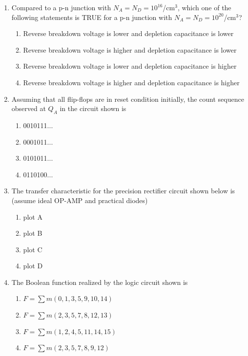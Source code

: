 \documentclass[journal,12pt,onecolumn]{IEEEtran}
\begin{document}
\begin{enumerate}
\item Compared to a p-n junction with $N_A=N_D=10^{16}$/cm$^3$, which one of the following statements is TRUE for a p-n junction with $N_A=N_D=10^{20}$/cm$^3$?
\begin{multicols}{2}
\begin{enumerate}
\item Reverse breakdown voltage is lower and depletion capacitance is lower
\item Reverse breakdown voltage is higher and depletion capacitance is lower
\item Reverse breakdown voltage is lower and depletion capacitance is higher
\item Reverse breakdown voltage is higher and depletion capacitance is higher
\end{enumerate}
\end{multicols}

\item Assuming that all flip-flops are in reset condition initially, the count sequence observed at $Q_A$ in the circuit shown is
\begin{multicols}{2}
\begin{enumerate}
\item 0010111...
\item 0001011...
\item 0101011...
\item 0110100...
\end{enumerate}
\end{multicols}

\item The transfer characteristic for the precision rectifier circuit shown below is (assume ideal OP-AMP and practical diodes)
\begin{multicols}{2}
\begin{enumerate}
\item plot A
\item plot B
\item plot C
\item plot D
\end{enumerate}
\end{multicols}

\item The Boolean function realized by the logic circuit shown is
\begin{multicols}{2}
\begin{enumerate}
\item $F=\sum m(0,1,3,5,9,10,14)$
\item $F=\sum m(2,3,5,7,8,12,13)$
\item $F=\sum m(1,2,4,5,11,14,15)$
\item $F=\sum m(2,3,5,7,8,9,12)$
\end{enumerate}
\end{multicols}


\end{enumerate}
\end{document}
